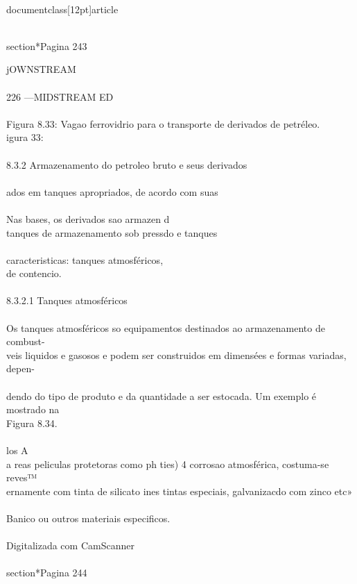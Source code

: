 \\documentclass[12pt]{article}
\begin{document}
\\section*{Pagina 243}

jOWNSTREAM\\
\\
226 —MIDSTREAM ED\\
\\
Figura 8.33: Vagao ferrovidrio para o transporte de derivados de petréleo.\\
igura 33:\\
\\
8.3.2 Armazenamento do petroleo bruto e seus derivados\\
\\
ados em tanques apropriados, de acordo com suas\\
\\
Nas bases, os derivados sao armazen d\\
tanques de armazenamento sob pressdo e tanques\\
\\
caracteristicas: tanques atmosféricos,\\
de contencio.\\
\\
8.3.2.1 Tanques atmosféricos\\
\\
Os tanques atmosféricos so equipamentos destinados ao armazenamento de combust-\\
veis liquidos e gasosos e podem ser construidos em dimensées e formas variadas, depen-\\
\\
dendo do tipo de produto e da quantidade a ser estocada. Um exemplo é mostrado na\\
Figura 8.34.\\
\\
los A\\
a reas peliculas protetoras como ph ties) 4 corrosao atmosférica, costuma-se reves™\\
ernamente com tinta de silicato ines tintas especiais, galvanizacdo com zinco etc»\\
\\
Banico ou outros materiais especificos.\\
\\
Digitalizada com CamScanner\\

\\section*{Pagina 244}
\end{document}
